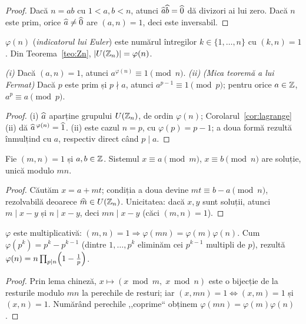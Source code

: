\begin{proof}
Dacă $n=ab$ cu $1<a,b<n$, atunci $\widehat{a}\widehat{b}=\widehat{0}$ dă divizori ai lui zero. Dacă $n$ este prim, orice $\widehat{a}\neq\widehat{0}$ are $(a,n)=1$, deci este inversabil.
\end{proof}

\begin{definitie}
$\varphi(n)$ (\emph{indicatorul lui Euler}) este numărul întregilor $k\in\{1,\dots,n\}$ cu $(k,n)=1$. Din Teorema~\ref{teo:Zn}, $|U(\mathbb{Z}_n)|=\varphi(n)$.
\end{definitie}

\begin{teorema}\label{teo:euler}
\emph{(i)} Dacă $(a,n)=1$, atunci $a^{\varphi(n)}\equiv1\pmod n$.
\emph{(ii)} \emph{(Mica teoremă a lui Fermat)} Dacă $p$ este prim și $p\nmid a$, atunci $a^{p-1}\equiv1\pmod p$; pentru orice $a\in\mathbb{Z}$, $a^p\equiv a\pmod p$.
\end{teorema}

\begin{proof}
(i) $\widehat{a}$ aparține grupului $U(\mathbb{Z}_n)$, de ordin $\varphi(n)$; Corolarul~\ref{cor:lagrange}(ii) dă $\widehat{a}^{\,\varphi(n)}=\widehat{1}$. (ii) este cazul $n=p$, cu $\varphi(p)=p-1$; a doua formă rezultă înmulțind cu $a$, respectiv direct când $p\mid a$.
\end{proof}

\begin{teorema}\label{teo:crt}
Fie $(m,n)=1$ și $a,b\in\mathbb{Z}$. Sistemul $x\equiv a\pmod m$, $x\equiv b\pmod n$ are soluție, unică modulo $mn$.
\end{teorema}

\begin{proof}
Căutăm $x=a+mt$; condiția a doua devine $mt\equiv b-a\pmod n$, rezolvabilă deoarece $\widehat{m}\in U(\mathbb{Z}_n)$. Unicitatea: dacă $x,y$ sunt soluții, atunci $m\mid x-y$ și $n\mid x-y$, deci $mn\mid x-y$ (căci $(m,n)=1$).
\end{proof}

\begin{corolar}\label{cor:phi}
$\varphi$ este multiplicativă: $(m,n)=1\Rightarrow\varphi(mn)=\varphi(m)\varphi(n)$. Cum $\varphi(p^k)=p^k-p^{k-1}$ (dintre $1,\dots,p^k$ eliminăm cei $p^{k-1}$ multipli de $p$), rezultă
$\varphi(n)=n\prod_{p\mid n}\Bigl(1-\frac1p\Bigr)$.
\end{corolar}

\begin{proof}
Prin lema chineză, $x\mapsto(x\bmod m,\;x\bmod n)$ este o bijecție de la resturile modulo $mn$ la perechile de resturi; iar $(x,mn)=1\iff(x,m)=1$ și $(x,n)=1$. Numărând perechile ,,coprime`` obținem $\varphi(mn)=\varphi(m)\varphi(n)$.
\end{proof}

